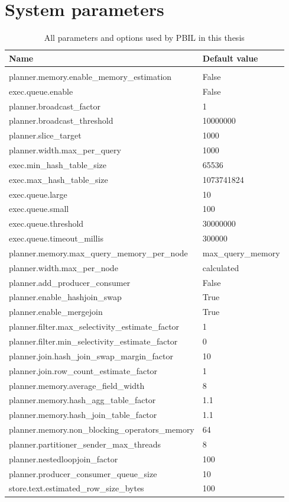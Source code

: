 \documentclass[a4paper,english]{report}
\begin{document}
\chapter{System parameters}
\label{system_params}
\begin{table}[ht]
	\centering
	\caption{All parameters and options used by PBIL in this thesis}
	\label{table:added_params}
	\begin{tabular}{ll}
		\\
		\multicolumn{1}{l}{\bfseries Name} & \multicolumn{1}{l}{\bfseries Default value} \\ \hline \\
		planner.memory.enable\_memory\_estimation & False  \\
		exec.queue.enable & False  \\
		planner.broadcast\_factor & 1  \\
		planner.broadcast\_threshold & 10000000  \\
		planner.slice\_target & 1000  \\
		planner.width.max\_per\_query & 1000  \\
		exec.min\_hash\_table\_size & 65536  \\
		exec.max\_hash\_table\_size & 1073741824  \\
		exec.queue.large & 10  \\
		exec.queue.small & 100  \\
		exec.queue.threshold & 30000000  \\
		exec.queue.timeout\_millis & 300000  \\
		planner.memory.max\_query\_memory\_per\_node &  max\_query\_memory  \\
		planner.width.max\_per\_node & calculated  \\
		planner.add\_producer\_consumer & False  \\
		planner.enable\_hashjoin\_swap & True  \\
		planner.enable\_mergejoin & True  \\
		planner.filter.max\_selectivity\_estimate\_factor & 1  \\
		planner.filter.min\_selectivity\_estimate\_factor & 0  \\
		planner.join.hash\_join\_swap\_margin\_factor & 10  \\
		planner.join.row\_count\_estimate\_factor & 1  \\
		planner.memory.average\_field\_width & 8  \\
		planner.memory.hash\_agg\_table\_factor & 1.1  \\
		planner.memory.hash\_join\_table\_factor & 1.1  \\
		planner.memory.non\_blocking\_operators\_memory & 64  \\
		planner.partitioner\_sender\_max\_threads & 8  \\
		planner.nestedloopjoin\_factor & 100  \\
		planner.producer\_consumer\_queue\_size & 10  \\
		store.text.estimated\_row\_size\_bytes & 100  \\
	\end{tabular}
\end{table}
\end{document}
